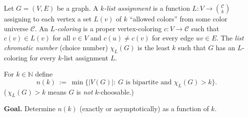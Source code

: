 Let $G=(V,E)$ be a graph.  A \emph{$k$-list assignment} is a function $L:V\to \binom{\mathcal{C}}{k}$ assigning to each vertex a set $L(v)$ of $k$ ``allowed colors'' from some color universe $\mathcal{C}$.
An \emph{$L$-coloring} is a proper vertex-coloring $c:V\to\mathcal{C}$ such that $c(v)\in L(v)$ for all $v\in V$ and $c(u)\ne c(v)$ for every edge $uv\in E$.
The \emph{list chromatic number} (choice number) $\chi_L(G)$ is the least $k$ such that $G$ has an $L$-coloring for every $k$-list assignment $L$.

For $k\in\mathbb{N}$ define
\[
n(k)\ :=\ \min\bigl\{|V(G)|:\ G\text{ is bipartite and }\chi_L(G)>k\bigr\}.
\]
(\,$\chi_L(G)>k$ means $G$ is \emph{not} $k$-choosable.)

\medskip
\noindent\textbf{Goal.} Determine $n(k)$ (exactly or asymptotically) as a function of $k$.
